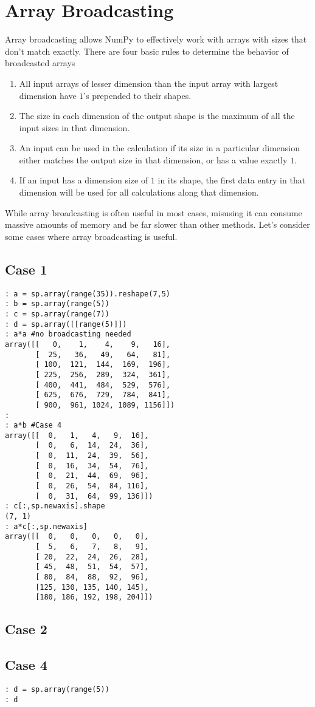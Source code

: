 \section*{Array Broadcasting}
Array broadcasting allows NumPy to effectively work with arrays with sizes that don't match exactly.  There are four basic rules to determine the behavior of broadcasted arrays

\begin{enumerate}
\item All input arrays of lesser dimension than the input array with largest dimension have $1$'s prepended to their shapes.
\item The size in each dimension of the output shape is the maximum of all the input sizes in that dimension.
\item An input can be used in the calculation if its size in a particular dimension either matches the output size in that dimension, or has a value exactly $1$.
\item If an input has a dimension size of $1$ in its shape, the first data entry in that dimension will be used for all calculations along that dimension.
\end{enumerate}

While array broadcasting is often useful in most cases, misusing it can consume massive amounts of memory and be far slower than other methods.  Let's consider some cases where array broadcasting is useful.

\subsection*{Case 1}
\begin{lstlisting}
: a = sp.array(range(35)).reshape(7,5)
: b = sp.array(range(5))
: c = sp.array(range(7))
: d = sp.array([[range(5)]])
: a*a #no broadcasting needed
array([[   0,    1,    4,    9,   16],
       [  25,   36,   49,   64,   81],
       [ 100,  121,  144,  169,  196],
       [ 225,  256,  289,  324,  361],
       [ 400,  441,  484,  529,  576],
       [ 625,  676,  729,  784,  841],
       [ 900,  961, 1024, 1089, 1156]])
: 
: a*b #Case 4
array([[  0,   1,   4,   9,  16],
       [  0,   6,  14,  24,  36],
       [  0,  11,  24,  39,  56],
       [  0,  16,  34,  54,  76],
       [  0,  21,  44,  69,  96],
       [  0,  26,  54,  84, 116],
       [  0,  31,  64,  99, 136]])
: c[:,sp.newaxis].shape
(7, 1)
: a*c[:,sp.newaxis]
array([[  0,   0,   0,   0,   0],
       [  5,   6,   7,   8,   9],
       [ 20,  22,  24,  26,  28],
       [ 45,  48,  51,  54,  57],
       [ 80,  84,  88,  92,  96],
       [125, 130, 135, 140, 145],
       [180, 186, 192, 198, 204]])
\end{lstlisting}

\subsection*{Case 2}
\subsection*{Case 4}
\begin{lstlisting}
: d = sp.array(range(5))
: d
\end{lstlisting}



